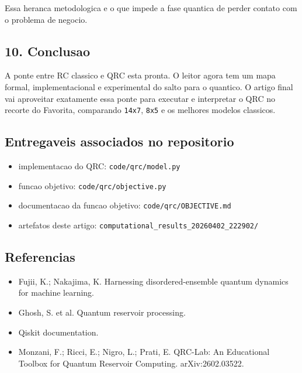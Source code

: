 \documentclass[12pt]{article}
\providecommand{\tightlist}{%
          \setlength{\itemsep}{0pt}\setlength{\parskip}{0pt}}
\begin{document}
Essa heranca metodologica e o que impede a fase quantica de perder contato com o problema de negocio.

\subsection{10. Conclusao}\label{10-conclusao}

A ponte entre RC classico e QRC esta pronta. O leitor agora tem um mapa formal, implementacional e experimental do salto para o quantico. O artigo final vai aproveitar exatamente essa ponte para executar e interpretar o QRC no recorte do Favorita, comparando \texttt{14x7}, \texttt{8x5} e os melhores modelos classicos.

\subsection{Entregaveis associados no repositorio}\label{entregaveis-associados-no-repositorio}

\begin{itemize}
\tightlist
\item
  implementacao do QRC: \texttt{code/qrc/model.py}
\item
  funcao objetivo: \texttt{code/qrc/objective.py}
\item
  documentacao da funcao objetivo: \texttt{code/qrc/OBJECTIVE.md}
\item
  artefatos deste artigo: \texttt{computational\_results\_20260402\_222902/}
\end{itemize}

\subsection{Referencias}\label{referencias}

\begin{itemize}
\tightlist
\item
  Fujii, K.; Nakajima, K. Harnessing disordered-ensemble quantum dynamics for machine learning.
\item
  Ghosh, S. et al. Quantum reservoir processing.
\item
  Qiskit documentation.
\item
  Monzani, F.; Ricci, E.; Nigro, L.; Prati, E. QRC-Lab: An Educational Toolbox for Quantum Reservoir Computing. arXiv:2602.03522.
\end{itemize}

        
\end{document}
